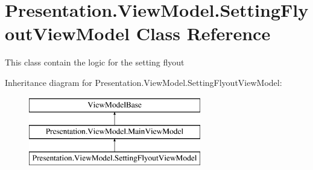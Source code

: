 \hypertarget{class_presentation_1_1_view_model_1_1_setting_flyout_view_model}{}\section{Presentation.\+View\+Model.\+Setting\+Flyout\+View\+Model Class Reference}
\label{class_presentation_1_1_view_model_1_1_setting_flyout_view_model}


This class contain the logic for the setting flyout  


Inheritance diagram for Presentation.\+View\+Model.\+Setting\+Flyout\+View\+Model\+:\begin{figure}[H]
\begin{center}
\leavevmode
\includegraphics[height=3.000000cm]{class_presentation_1_1_view_model_1_1_setting_flyout_view_model}
\end{center}
\end{figure}
